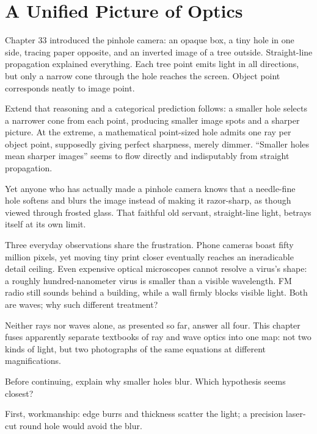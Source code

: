 \chapter{A Unified Picture of Optics}


Chapter 33 introduced the pinhole camera: an opaque box, a tiny hole in one side, tracing paper opposite, and an inverted image of a tree outside. Straight-line propagation explained everything. Each tree point emits light in all directions, but only a narrow cone through the hole reaches the screen. Object point corresponds neatly to image point.

Extend that reasoning and a categorical prediction follows: a smaller hole selects a narrower cone from each point, producing smaller image spots and a sharper picture. At the extreme, a mathematical point-sized hole admits one ray per object point, supposedly giving perfect sharpness, merely dimmer. ``Smaller holes mean sharper images'' seems to flow directly and indisputably from straight propagation.

Yet anyone who has actually made a pinhole camera knows that a needle-fine hole softens and blurs the image instead of making it razor-sharp, as though viewed through frosted glass. That faithful old servant, straight-line light, betrays itself at its own limit.

Three everyday observations share the frustration. Phone cameras boast fifty million pixels, yet moving tiny print closer eventually reaches an ineradicable detail ceiling. Even expensive optical microscopes cannot resolve a virus's shape: a roughly hundred-nanometer virus is smaller than a visible wavelength. FM radio still sounds behind a building, while a wall firmly blocks visible light. Both are waves; why such different treatment?

Neither rays nor waves alone, as presented so far, answer all four. This chapter fuses apparently separate textbooks of ray and wave optics into one map: not two kinds of light, but two photographs of the same equations at different magnifications.


Before continuing, explain why smaller holes blur. Which hypothesis seems closest?

First, workmanship: edge burrs and thickness scatter the light; a precision laser-cut round hole would avoid the blur.

